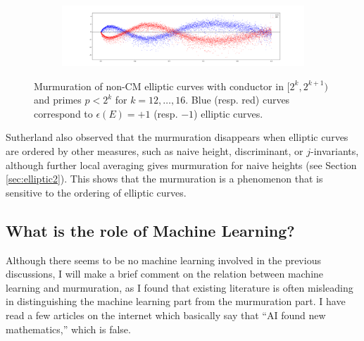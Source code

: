 \begin{figure}[htp]
    \begin{subfigure}{1.0\textwidth}
        \centering
        \includegraphics[width=\textwidth]{src/sutherland_65536.png}%
        \label{fig:sutherland_65536}
    \end{subfigure}
    \caption{Murmuration of non-CM elliptic curves with conductor in $[2^{k}, 2^{k+1})$ and primes $p < 2^{k}$ for $k = 12, \dots, 16$. Blue (resp. red) curves correspond to $\epsilon(E) = +1$ (resp. $-1$) elliptic curves.}
\label{fig:sutherland_elliptic_dyadic}
\end{figure}


Sutherland also observed that the murmuration disappears when elliptic curves are ordered by other measures, such as naive height, discriminant, or $j$-invariants, although further local averaging gives murmuration for naive heights (see Section \ref{sec:elliptic2}).
This shows that the murmuration is a phenomenon that is sensitive to the ordering of elliptic curves.


\subsection{What is the role of Machine Learning?}

Although there seems to be no machine learning involved in the previous discussions, I will make a brief comment on the relation between machine learning and murmuration, as I found that existing literature is often misleading in distinguishing the machine learning part from the murmuration part.
I have read a few articles on the internet which basically say that ``AI found new mathematics,'' which is false.

